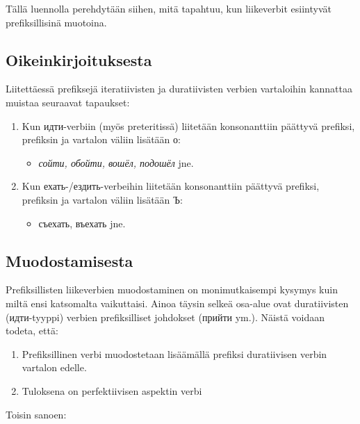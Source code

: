 \documentclass[]{scrartcl}
\providecommand{\tightlist}{%
  \setlength{\itemsep}{0pt}\setlength{\parskip}{0pt}}
\begin{document}
Tällä luennolla perehdytään siihen, mitä tapahtuu, kun liikeverbit
esiintyvät prefiksillisinä muotoina.

\subsection{Oikeinkirjoituksesta}\label{oikeinkirjoituksesta}

Liitettäessä prefiksejä iteratiivisten ja duratiivisten verbien
vartaloihin kannattaa muistaa seuraavat tapaukset:

\begin{enumerate}
\def\labelenumi{\arabic{enumi}.}
\tightlist
\item
  Kun идти-verbiin (myös preteritissä) liitetään konsonanttiin päättyvä
  prefiksi, prefiksin ja vartalon väliin lisätään о:

  \begin{itemize}
  \tightlist
  \item
    \emph{сойти, обойти, вошёл, подошёл} jne.
  \end{itemize}
\item
  Kun ехать-/ездить-verbeihin liitetään konsonanttiin päättyvä prefiksi,
  prefiksin ja vartalon väliin lisätään Ъ:

  \begin{itemize}
  \tightlist
  \item
    съехать, въехать jne.
  \end{itemize}
\end{enumerate}

\subsection{Muodostamisesta}\label{muodostamisesta}

Prefiksillisten liikeverbien muodostaminen on monimutkaisempi kysymys
kuin miltä ensi katsomalta vaikuttaisi. Ainoa täysin selkeä osa-alue
ovat duratiivisten (идти-tyyppi) verbien prefiksilliset johdokset
(прийти ym.). Näistä voidaan todeta, että:

\begin{enumerate}
\def\labelenumi{\arabic{enumi}.}
\tightlist
\item
  Prefiksillinen verbi muodostetaan lisäämällä prefiksi duratiivisen
  verbin vartalon edelle.
\item
  Tuloksena on perfektiivisen aspektin verbi
\end{enumerate}

Toisin sanoen:
\end{document}

